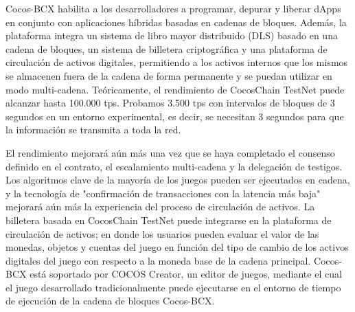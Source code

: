 \documentclass{article}
\begin{document}
Cocos-BCX habilita a los desarrolladores a programar, depurar y liberar dApps en conjunto con aplicaciones híbridas basadas en cadenas de bloques.
Además, la plataforma integra un sistema de libro mayor distribuido (DLS) basado en una cadena de bloques, un sistema de billetera criptográfica y una plataforma de circulación de activos digitales, permitiendo a los activos internos que los mismos se almacenen fuera de la cadena de forma permanente y se puedan utilizar en modo multi-cadena.
Teóricamente, el rendimiento de CocosChain TestNet puede alcanzar hasta 100.000 tps. Probamos 3.500 tps con intervalos de bloques de 3 segundos en un entorno experimental, es decir, se necesitan 3 segundos para que la información se transmita a toda la red.

El rendimiento mejorará aún más una vez que se haya completado el consenso definido en el contrato, el escalamiento multi-cadena y la delegación de testigos. Los algoritmos clave de la mayoría de los juegos pueden ser ejecutados en cadena, y la tecnología de "confirmación de transacciones con la latencia más baja" mejorará aún más la experiencia del proceso de circulación de activos.
La billetera basada en CocosChain TestNet puede integrarse en la plataforma de circulación de activos; en donde los usuarios pueden evaluar el valor de las monedas, objetos y cuentas del juego en función del tipo de cambio de los activos digitales del juego con respecto a la moneda base de la cadena principal.
Cocos-BCX está soportado por COCOS Creator, un editor de juegos, mediante el cual el juego desarrollado tradicionalmente puede ejecutarse en el entorno de tiempo de ejecución de la cadena de bloques Cocos-BCX.
\end{document}
